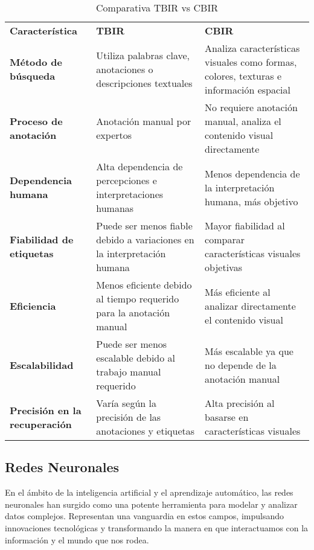 \begin{table}[H]
    \centering
    \renewcommand{\arraystretch}{1.5}
    \begin{tabular}{p{5cm}p{5cm}p{5cm}}
        \rowcolor{gray!30}
        \textbf{Característica} & \textbf{TBIR} & \textbf{CBIR} \\
        \rowcolor{gray!10}
        \textbf{Método de búsqueda} & Utiliza palabras clave, anotaciones o descripciones textuales & Analiza características visuales como formas, colores, texturas e información espacial \\
        \addlinespace
        \textbf{Proceso de anotación} & Anotación manual por expertos & No requiere anotación manual, analiza el contenido visual directamente \\
        \rowcolor{gray!10}
        \textbf{Dependencia humana} & Alta dependencia de percepciones e interpretaciones humanas & Menos dependencia de la interpretación humana, más objetivo \\
        \addlinespace
        \textbf{Fiabilidad de etiquetas} & Puede ser menos fiable debido a variaciones en la interpretación humana & Mayor fiabilidad al comparar características visuales objetivas \\
        \rowcolor{gray!10}
        \textbf{Eficiencia} & Menos eficiente debido al tiempo requerido para la anotación manual & Más eficiente al analizar directamente el contenido visual \\
        \addlinespace
        \textbf{Escalabilidad} & Puede ser menos escalable debido al trabajo manual requerido & Más escalable ya que no depende de la anotación manual \\
        \rowcolor{gray!10}
        \textbf{Precisión en la recuperación} & Varía según la precisión de las anotaciones y etiquetas & Alta precisión al basarse en características visuales \\
    \end{tabular}
    \caption{Comparativa TBIR vs CBIR}
    \label{tab:tbir-cbir}
\end{table}


\subsection{Redes Neuronales}
En el ámbito de la inteligencia artificial y el aprendizaje automático, las redes neuronales han surgido como una potente herramienta para modelar y analizar datos complejos. Representan una vanguardia en estos campos, impulsando innovaciones tecnológicas y transformando la manera en que interactuamos con la información y el mundo que nos rodea.

